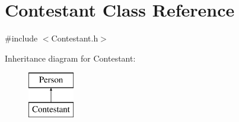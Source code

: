 \hypertarget{class_contestant}{}\section{Contestant Class Reference}
\label{class_contestant}


{\ttfamily \#include $<$Contestant.\+h$>$}

Inheritance diagram for Contestant\+:\begin{figure}[H]
\begin{center}
\leavevmode
\includegraphics[height=2.000000cm]{class_contestant}
\end{center}
\end{figure}
